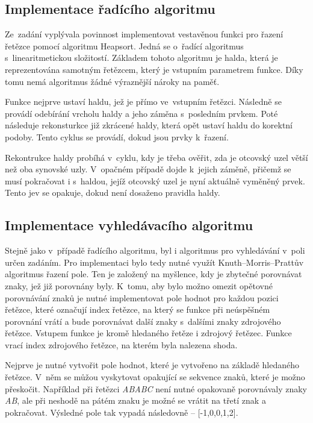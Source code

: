 \documentclass[12pt,a4paper,titlepage,final]{article}
\begin{document}
    \subsection{Implementace řadícího algoritmu}

    Ze~zadání vyplývala povinnost implementovat vestavěnou funkci pro řazení
    řetězce pomocí algoritmu Heapsort. Jedná se o~řadící algoritmus
    s~linearitmetickou složitostí. Základem tohoto algoritmu je halda, která
    je reprezentována samotným řetězcem, který je vstupním parametrem funkce.
    Díky tomu nemá algoritmus žádné výraznější nároky na paměť.

    Funkce nejprve ustaví haldu, jež je přímo ve~vstupním řetězci. Následně se
    provádí odebírání vrcholu haldy a jeho záměna s~posledním prvkem. Poté
    následuje rekonsturkce již zkrácené haldy, která opět ustaví haldu do
    korektní podoby. Tento cyklus se provádí, dokud jsou prvky k~řazení.

    Rekontrukce haldy probíhá v~cyklu, kdy je třeba ověřit, zda je otcovský
    uzel větší než oba synovské uzly. V~opačném případě dojde k~jejich záměně,
    přičemž se musí pokračovat i s~haldou, jejíž otcovský uzel je nyní
    aktuálně vyměněný prvek. Tento jev se opakuje, dokud není dosaženo
    pravidla haldy.

    \subsection{Implementace vyhledávacího algoritmu}

    Stejně jako v~případě řadícího algoritmu, byl i algoritmus pro vyhledávání
    v~poli určen zadáním. Pro implementaci bylo tedy nutné využít
    Knuth–Morris–Prattův algoritmus řazení pole. Ten je založený na myšlence,
    kdy je zbytečné porovnávat znaky, jež již porovnány byly. K~tomu, aby bylo
    možno omezit opětovné porovnávání znaků je nutné implementovat pole hodnot
    pro každou pozici řetězce, které označují index řetězce, na který se
    funkce při neúspěšném porovnání vrátí a bude porovnávat další znaky
    s~dalšími znaky zdrojového řetězce. Vstupem funkce je kromě hledaného
    řetěze i zdrojový řetězec. Funkce vrací index zdrojového řetězce, na
    kterém byla nalezena shoda.

    Nejprve je nutné vytvořit pole hodnot, které je vytvořeno na základě
    hledaného řetězce. V~něm se můžou vyskytovat opakující se sekvence znaků,
    které je možno přeskočit. Například při řetězci \textsl{ABABC} není nutné
    opakovaně porovnávaly znaky \textsl{AB}, ale při neshodě na pátém znaku je
    možné se vrátit na třetí znak a pokračovat. Výsledné pole tak vypadá
    následovně -- [-1,0,0,1,2].
\end{document}
